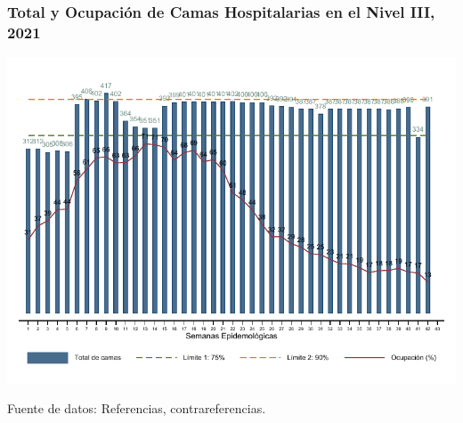 \documentclass[xcolor=table]{beamer}
\begin{document}
	\begin{frame}
		\frametitle{Total y Ocupación de Camas Hospitalarias en el Nivel III, 2021}
		\vspace{-.5cm}
		\begin{center}
			\includegraphics[width=0.8\linewidth, trim={0cm .5cm 0cm 0.2cm},clip]{../figuras/nivel_3.pdf}
		\end{center}
		{\tiny Fuente de datos: Referencias, contrareferencias.}
	\end{frame}
	
\end{document}
